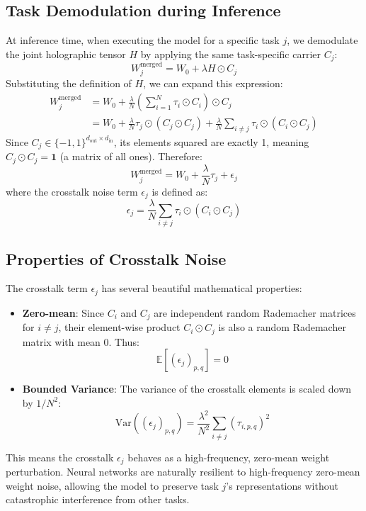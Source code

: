 \documentclass{article}
\begin{document}
\subsection{Task Demodulation during Inference}
At inference time, when executing the model for a specific task $j$, we demodulate the joint holographic tensor $H$ by applying the same task-specific carrier $C_j$:
\begin{equation}
    W_j^{\text{merged}} = W_0 + \lambda H \odot C_j
\end{equation}
Substituting the definition of $H$, we can expand this expression:
\begin{align}
    W_j^{\text{merged}} &= W_0 + \frac{\lambda}{N} \left( \sum_{i=1}^N \tau_i \odot C_i \right) \odot C_j \\
    &= W_0 + \frac{\lambda}{N} \tau_j \odot (C_j \odot C_j) + \frac{\lambda}{N} \sum_{i \neq j} \tau_i \odot (C_i \odot C_j)
\end{align}
Since $C_j \in \{-1, 1\}^{d_{\text{out}} \times d_{\text{in}}}$, its elements squared are exactly 1, meaning $C_j \odot C_j = \mathbf{1}$ (a matrix of all ones). Therefore:
\begin{equation}
    W_j^{\text{merged}} = W_0 + \frac{\lambda}{N} \tau_j + \epsilon_j
\end{equation}
where the crosstalk noise term $\epsilon_j$ is defined as:
\begin{equation}
    \epsilon_j = \frac{\lambda}{N} \sum_{i \neq j} \tau_i \odot (C_i \odot C_j)
\end{equation}

\subsection{Properties of Crosstalk Noise}
The crosstalk term $\epsilon_j$ has several beautiful mathematical properties:
\begin{itemize}
    \item \textbf{Zero-mean}: Since $C_i$ and $C_j$ are independent random Rademacher matrices for $i \neq j$, their element-wise product $C_i \odot C_j$ is also a random Rademacher matrix with mean 0. Thus:
    \begin{equation}
        \mathbb{E}[(\epsilon_j)_{p, q}] = 0
    \end{equation}
    \item \textbf{Bounded Variance}: The variance of the crosstalk elements is scaled down by $1/N^2$:
    \begin{equation}
        \text{Var}((\epsilon_j)_{p, q}) = \frac{\lambda^2}{N^2} \sum_{i \neq j} (\tau_{i, p, q})^2
    \end{equation}
\end{itemize}
This means the crosstalk $\epsilon_j$ behaves as a high-frequency, zero-mean weight perturbation. Neural networks are naturally resilient to high-frequency zero-mean weight noise, allowing the model to preserve task $j$'s representations without catastrophic interference from other tasks.
\end{document}
